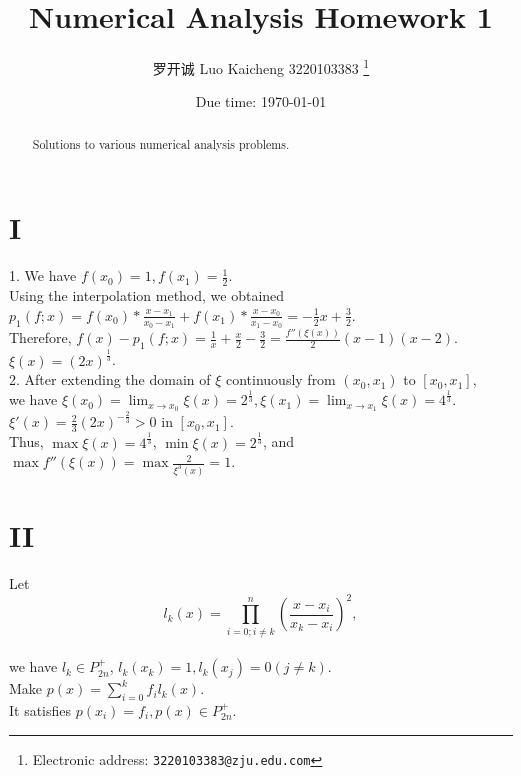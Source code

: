 \documentclass[a4paper]{article}
\begin{document}
\title{Numerical Analysis Homework 1}

\author{罗开诚 Luo Kaicheng 3220103383
  \thanks{Electronic address: \texttt{3220103383@zju.edu.com}}}

\date{Due time: \today}

\maketitle

\begin{abstract}
    Solutions to various numerical analysis problems.
\end{abstract}


\section*{I}
1. We have \( f(x_0) = 1, f(x_1) = \frac{1}{2} \). \\
Using the interpolation method, we obtained \\
\( p_1(f; x) = f(x_0)*\frac{x-x_1}{x_0-x_1}+f(x_1)*\frac{x-x_0}{x_1-x_0}= -\frac{1}{2}x + \frac{3}{2} \). \\
Therefore, \( f(x) - p_1(f; x) = \frac{1}{x} + \frac{x}{2} - \frac{3}{2} = \frac{f''(\xi(x))}{2}(x - 1)(x - 2) \). \\
\( \xi(x) = (2x)^{\frac{1}{3}} \).
\\
2. After extending the domain of \( \xi \) continuously from \( (x_0, x_1) \) to \( [x_0, x_1] \), \\
we have \( \xi(x_0) = \lim_{x \to x_0} \xi(x) = 2^{\frac{1}{3}}, \xi(x_1) = \lim_{x \to x_1} \xi(x) = 4^{\frac{1}{3}} \). \( \xi'(x) = \frac{2}{3}(2x)^{-\frac{2}{3}} > 0 \) in \( [x_0, x_1] \).\\
 Thus, \( \max \xi(x) = 4^{\frac{1}{3}} \), \( \min \xi(x) = 2^{\frac{1}{3}} \), and \( \max f''(\xi(x)) = \max \frac{2}{\xi^3(x)} = 1 \).
\\
\section*{II}
Let
\[
l_k(x) = \prod_{i=0; i \neq k}^n \left( \frac{x - x_i}{x_k - x_i} \right)^2,
\]
\\we have \( l_k \in P_{2n}^{+} \),  \(l_k(x_k)=1,l_k(x_j)=0 (j \neq k) \).\\
Make \( p(x) = \sum_{i=0}^{k} f_i l_k(x) \).\\
It satisfies \( p(x_i) = f_i, p(x) \in P_{2n}^{+} \).
\end{document}
